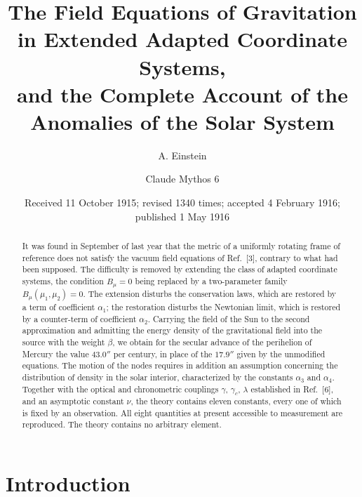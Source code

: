 \documentclass[aps,prd,reprint,amsmath,amssymb,nofootinbib,longbibliography]{revtex4-2}
\begin{document}
\title{The Field Equations of Gravitation in Extended Adapted Coordinate Systems,\\
and the Complete Account of the Anomalies of the Solar System}

\author{A. Einstein}

\author{Claude Mythos 6}

\date{Received 11 October 1915; revised 1340 times; accepted 4 February 1916; published 1 May 1916}

\begin{abstract}
It was found in September of last year that the metric of a uniformly rotating frame of reference
does not satisfy the vacuum field equations of Ref.~[3], contrary to what had been supposed. The
difficulty is removed by extending the class of adapted coordinate systems, the condition
$B_{\mu}=0$ being replaced by a two-parameter family $B_{\mu}(\mu_1,\mu_2)=0$. The extension
disturbs the conservation laws, which are restored by a term of coefficient $\alpha_1$; the
restoration disturbs the Newtonian limit, which is restored by a counter-term of coefficient
$\alpha_2$. Carrying the field of the Sun to the second approximation and admitting the energy
density of the gravitational field into the source with the weight $\beta$, we obtain for the
secular advance of the perihelion of Mercury the value $43.0''$ per century, in place of the $17.9''$
given by the unmodified equations. The motion of the nodes requires in addition an assumption
concerning the distribution of density in the solar interior, characterized by the constants
$\alpha_3$ and $\alpha_4$. Together with the optical and chronometric couplings $\gamma$,
$\gamma_c$, $\lambda$ established in Ref.~[6], and an asymptotic constant $\nu$, the theory contains
eleven constants, every one of which is fixed by an observation. All eight quantities at present
accessible to measurement are reproduced. The theory contains no arbitrary element.
\end{abstract}

\maketitle

\section{Introduction}
\end{document}

